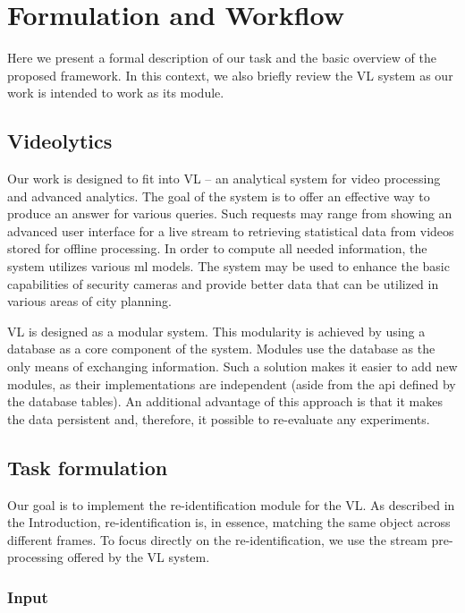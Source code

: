 \chapter{Formulation and Workflow}

Here we present a formal description of our task and the basic overview of the proposed framework. In this context, we also briefly review the \gls{VL} system as our work is intended to work as its module.

\section{Videolytics}

Our work is designed to fit into \gls{VL}  -- an analytical system for video processing and advanced analytics. The goal of the system is to offer an effective way to produce an answer for various queries. Such requests may range from showing an advanced user interface for a live stream to retrieving statistical data from videos stored for offline processing. In order to compute all needed information, the system utilizes various \gls{ml} models. The system may be used to enhance the basic capabilities of security cameras and provide better data that can be utilized in various areas of city planning.

\Gls{VL} is designed as a modular system. This modularity is achieved by using a database as a core component of the system. Modules use the database as the only means of exchanging information. Such a solution makes it easier to add new modules, as their implementations are independent (aside from the \gls{api} defined by the database tables). An additional advantage of this approach is that it makes the data persistent and, therefore, it possible to re-evaluate any experiments.

\section{Task formulation}

Our goal is to implement the re-identification module for the \gls{VL}. As described in the Introduction, re-identification is, in essence, matching the same object across different frames. To focus directly on the re-identification, we use the stream pre-processing offered by the \gls{VL} system.

\subsection{Input}

